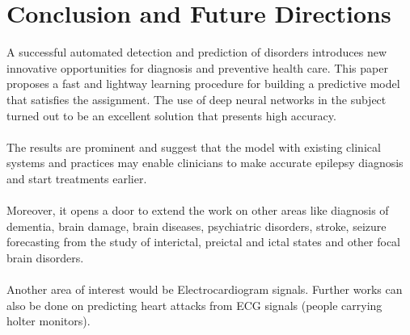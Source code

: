 \documentclass{llncs}       %
\begin{document}
\paragraph{}\paragraph{}
\paragraph{}\paragraph{}
\paragraph{}\paragraph{}


\section{Conclusion and Future Directions}
\label{sec:4}



 A successful automated detection and prediction of disorders introduces new innovative opportunities for diagnosis and preventive health care. This paper proposes a fast and lightway learning procedure for building a predictive model that satisfies the assignment. The use of deep neural networks in the subject turned out to be an excellent solution that presents high accuracy.  
\paragraph{}
The results are prominent and suggest that the model with existing clinical systems and practices may enable clinicians to make accurate epilepsy diagnosis and start  treatments earlier.
\paragraph{}
Moreover, it opens a door to extend the work on other areas like diagnosis of dementia, brain damage, brain diseases, psychiatric disorders, stroke, seizure forecasting from the study of interictal, preictal and ictal states and other focal brain disorders. 
\paragraph{}
Another area of interest would be Electrocardiogram signals. Further works can also be done on predicting heart attacks from ECG signals (people carrying holter monitors). 
\end{document}
